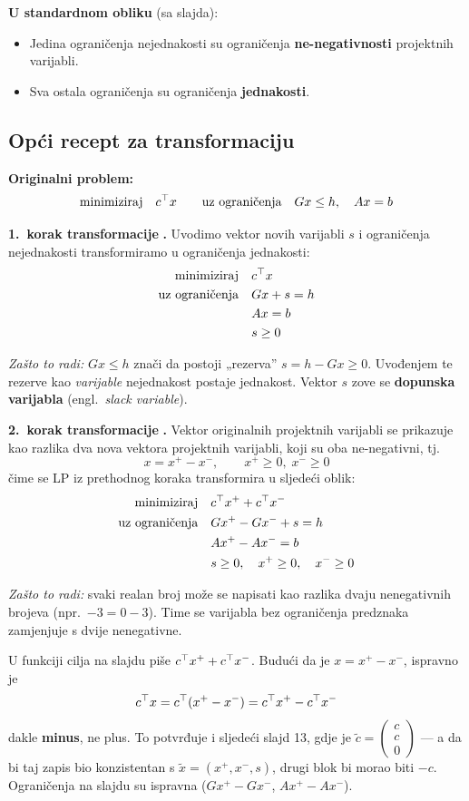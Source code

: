 \textbf{U standardnom obliku} (sa slajda):
\begin{itemize}
  \item Jedina ograničenja nejednakosti su ograničenja \textbf{ne-negativnosti}
        projektnih varijabli.
  \item Sva ostala ograničenja su ograničenja \textbf{jednakosti}.
\end{itemize}

\subsection{Opći recept za transformaciju}

\textbf{Originalni problem:}
\[
\minim c\T x \qquad \uzogr Gx \le h, \quad Ax = b
\]

\textbf{1.\ korak transformacije} \textbf{.} Uvodimo vektor novih
varijabli $s$ i ograničenja nejednakosti transformiramo u ograničenja
jednakosti:
\[
\begin{aligned}
\minim & c\T x \\
\uzogr & Gx + s = h \\
       & Ax = b \\
       & s \ge 0
\end{aligned}
\]

\emph{Zašto to radi:} $Gx \le h$ znači da postoji „rezerva” $s = h - Gx \ge 0$.
Uvođenjem te rezerve kao \emph{varijable} nejednakost postaje jednakost. Vektor
$s$ zove se \textbf{dopunska varijabla} (engl.\ \emph{slack variable}).

\textbf{2.\ korak transformacije} \textbf{.} Vektor originalnih
projektnih varijabli se prikazuje kao razlika dva nova vektora projektnih
varijabli, koji su oba ne-negativni, tj.
\[
x = x^+ - x^-, \qquad x^+ \ge 0,\; x^- \ge 0
\]
čime se LP iz prethodnog koraka transformira u sljedeći oblik:
\[
\begin{aligned}
\minim & c\T x^+ + c\T x^- \\
\uzogr & Gx^+ - Gx^- + s = h \\
       & Ax^+ - Ax^- = b \\
       & s \ge 0,\quad x^+ \ge 0,\quad x^- \ge 0
\end{aligned}
\]

\emph{Zašto to radi:} svaki realan broj može se napisati kao razlika dvaju
nenegativnih brojeva (npr.\ $-3 = 0 - 3$). Time se varijabla bez ograničenja
predznaka zamjenjuje s dvije nenegativne.

\begin{napomena}
U funkciji cilja na slajdu piše $c\T x^+ + c\T x^-$. Budući da je
$x = x^+ - x^-$, ispravno je
\[
c\T x = c\T(x^+ - x^-) = c\T x^+ - c\T x^-
\]
dakle \textbf{minus}, ne plus. To potvrđuje i sljedeći slajd 13, gdje je
$\tilde c = \begin{pmatrix} c \\ c \\ 0\end{pmatrix}$ --- a da bi taj zapis bio
konzistentan s $\tilde x = (x^+, x^-, s)$, drugi blok bi morao biti $-c$.
Ograničenja na slajdu su ispravna ($Gx^+ - Gx^-$, $Ax^+ - Ax^-$).
\end{napomena}

